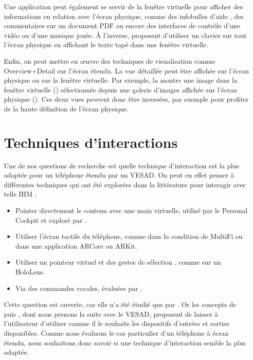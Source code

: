 Une application peut également se servir de la fenêtre virtuelle pour afficher des informations en relation avec l'écran physique, comme des infobulles d'aide , des commentaires sur un document PDF ou encore des interfaces de contrôle d'une vidéo ou d'une musique jouée. À l'inverse, \cite{Grubert2015} proposent d'utiliser un clavier sur tout l'écran physique en affichant le texte tapé dans une fenêtre virtuelle.

Enfin, on peut mettre en œuvre des techniques de visualisation comme Overview+Detail sur l'écran étendu. La vue détaillée peut être affichée sur l'écran physique ou sur la fenêtre virtuelle. Par exemple, la  montre une image dans la fenêtre virtuelle () sélectionnée depuis une galerie d'images affichée sur l'écran physique (). Ces deux vues peuvent donc être inversées, par exemple pour profiter de la haute définition de l'écran physique.


\section{Techniques d'interactions}
\label{sec:concept_interaction_techniques}

Une de nos questions de recherche  est quelle technique d'interaction est la plus adaptée pour un téléphone étendu par un VESAD. On peut en effet penser à différentes techniques qui ont été explorées dans la littérature pour interagir avec telle IHM :

\begin{itemize}
  \item Pointer directement le contenu avec une main virtuelle, utilisé par le Personal Cockpit \citep{Ens2014} et exploré par \cite{Piumsomboon2013}.
  \item Utiliser l'écran tactile du téléphone, comme dans la condition  de MultiFi \citep{Grubert2015} ou dans une application ARCore ou ARKit.
  \item Utiliser un pointeur virtuel et des gestes de sélection \citep{Wilson2006}, comme sur un HoloLens.
  \item Via des commandes vocales, évaluées par \cite{Piumsomboon2014}.
\end{itemize}
\medskip

Cette question est ouverte, car elle n'a été étudié que par \cite{Grubert2015}. Or les concepts de \cite{Serrano2015} puis \cite{Serrano2015a}, dont nous prenons la suite avec le VESAD, proposent de laisser à l'utilisateur d'utiliser comme il le souhaite les dispositifs d'entrées et sorties disponibles. Comme nous évaluons le cas particulier d'un téléphone à écran étendu, nous souhaitons donc savoir si une technique d'interaction semble la plus adaptée.

